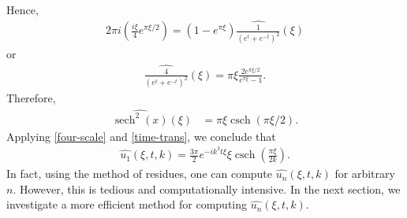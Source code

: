 \documentclass[12pt,reqno]{amsart}
\numberwithin{equation}{section}  %
\newcommand{\wh}{\widehat}
\DeclareMathOperator{\sech}{sech}
\DeclareMathOperator{\csch}{csch}
\begin{document}
        Hence,  
        \begin{equation*}
        \begin{split}
          2 \pi i\left( \frac{i\xi}{4} e^{\pi \xi/2} \right) = \left (1 -
          e^{ \pi \xi} \right ) \wh{\frac{1}{(e^{t} + e^{-t})^{2}}}(\xi)
        \end{split}
        \end{equation*}
        or
        \begin{equation*}
        \begin{split}
          \wh{\frac{4}{(e^{t} + e^{-t})^{2}}}(\xi) = \pi \xi \frac{2  e^{ \pi \xi
          /2}}{e^{ \pi \xi} -1}.
        \end{split}
        \end{equation*}
        Therefore, 
        \begin{equation*}
        \begin{split}
          \wh{\sech^{2}(x)}(\xi)
          & = \pi \xi \csch( \pi \xi/2).
        \end{split}
        \end{equation*}
        Applying \eqref{four-scale} and \eqref{time-trans}, we conclude that
        \begin{equation}
          \label{kdv-sol-four}
        \begin{split}
          \wh{u_{1}}(\xi, t, k) = \frac{3 \pi }{2} e^{-ik^{3}t \xi} \xi
          \csch \left (\frac{\pi \xi}{2k} \right ).
        \end{split}
        \end{equation}
In fact, using the method of residues, one can compute $\wh{u_{n}}(\xi, t, k)$
        for arbitrary $n$. However, this is tedious and computationally
        intensive.  In the next section, we investigate a more efficient method
        for computing $\wh{u_{n}}(\xi, t, k)$. 
\end{document}
